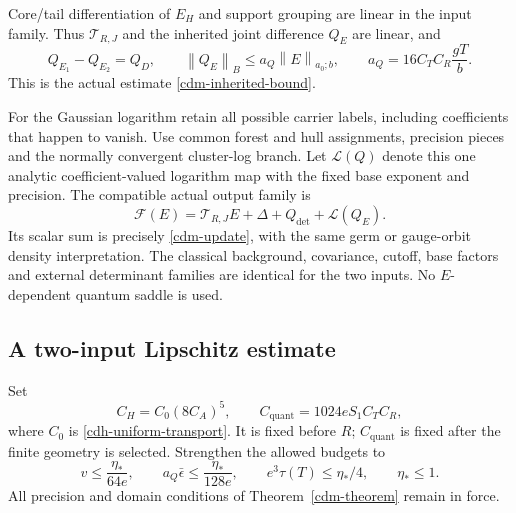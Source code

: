 \documentclass[11pt]{article}
\theoremstyle{remark}
\newcommand{\norm}[1]{\left\|#1\right\|}
\begin{document}
Core/tail differentiation of $E_H$ and support grouping are
linear in the input family. Thus $\mathcal T_{R,J}$ and the
inherited joint difference $Q_E$ are linear, and
\begin{equation}
 Q_{E_1}-Q_{E_2}=Q_D,\qquad
 \norm{Q_E}_B\le a_Q\norm{E}_{a_0;b},\qquad
 a_Q=16C_TC_R\frac{gT}{b}.
 \label{cdq-Q-linear}
\end{equation}
This is the actual estimate \eqref{cdm-inherited-bound}.

For the Gaussian logarithm retain all possible carrier
labels, including coefficients that happen to vanish.
Use common forest and hull assignments, precision pieces
and the normally convergent cluster-log branch. Let
$\mathcal L(Q)$ denote this one analytic coefficient-valued
logarithm map with the fixed base exponent and precision.
The compatible actual output family is
\begin{equation}
 \mathscr F(E)=
 \mathcal T_{R,J}E+\Delta+Q_{\det}+\mathcal L(Q_E).
 \label{cdq-output-map}
\end{equation}
Its scalar sum is precisely \eqref{cdm-update}, with the
same germ or gauge-orbit density interpretation. The
classical background, covariance, cutoff, base factors
and external determinant families are identical for
the two inputs. No $E$-dependent quantum saddle is used.

\subsection{A two-input Lipschitz estimate}
\label{cdq-theorem-section}

Set
\begin{equation}
 C_H=C_0(8C_A)^5,\qquad
 C_{\mathrm{quant}}=1024eS_1C_TC_R,
 \label{cdq-constants}
\end{equation}
where $C_0$ is \eqref{cdh-uniform-transport}. It is fixed
before $R$; $C_{\mathrm{quant}}$ is fixed after the finite
geometry is selected. Strengthen the allowed budgets to
\begin{equation}
 v\le\frac{\eta_*}{64e},\qquad
 a_Q\bar\epsilon\le\frac{\eta_*}{128e},\qquad
 e^3\tau(T)\le\eta_*/4,\qquad \eta_*\le1.
 \label{cdq-budgets}
\end{equation}
All precision and domain conditions of
Theorem~\ref{cdm-theorem} remain in force.
\end{document}

